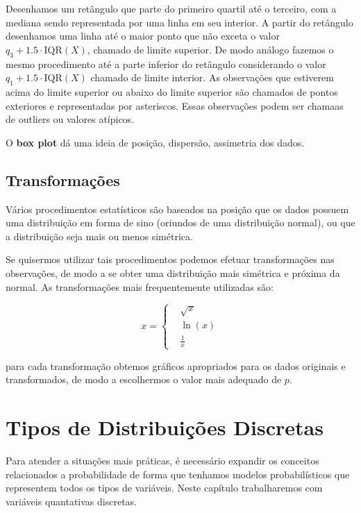 \documentclass[
]{book}
\begin{document}
Desenhamos um retângulo que parte do primeiro quartil até o terceiro, com a mediana sendo representada por uma linha em seu interior. A partir do retângulo desenhamos uma linha até o maior ponto que não exceta o valor \(q_3+1.5 \cdot \text{IQR}(X)\), chamado de limite superior. De modo análogo fazemos o mesmo procedimento até a parte inferior do retângulo considerando o valor \(q_1 + 1.5 \cdot \text{IQR}(X)\) chamado de limite interior. As observações que estiverem acima do limite superior ou abaixo do limite superior são chamados de pontos exteriores e representadas por asteriscos. Essas observações podem ser chamaas de outliers ou valores atípicos.

O \textbf{box plot} dá uma ideia de posição, dispersão, assimetria dos dados.

\hypertarget{transformauxe7uxf5es}{%
\section{Transformações}\label{transformauxe7uxf5es}}

Vários procedimentos estatísticos são baseados na posição que os dados possuem uma distribuição em forma de sino (oriundos de uma distribuição normal), ou que a distribuição seja mais ou menos simétrica.

Se quisermos utilizar tais procedimentos podemos efetuar transformações nas observações, de modo a se obter uma distribuição mais simétrica e próxima da normal. As transformações mais frequentemente utilizadas são:

\[
x = \left\{\begin{matrix}&\sqrt{x}\\ &\ln(x) \\&\frac{1}{x}\end{matrix}\right.
\]

para cada transformação obtemos gráficos apropriados para os dados originais e transformados, de modo a escolhermos o valor mais adequado de \(p\).

\hypertarget{tipos-de-distribuiuxe7uxf5es-discretas}{%
\chapter{Tipos de Distribuições Discretas}\label{tipos-de-distribuiuxe7uxf5es-discretas}}

Para atender a situações mais práticas, é necessário expandir os conceitos relacionados a probabilidade de forma que tenhamos modelos probabilísticos que representem todos os tipos de variáveis. Neste capítulo trabalharemos com variáveis quantativas discretas.
\end{document}
